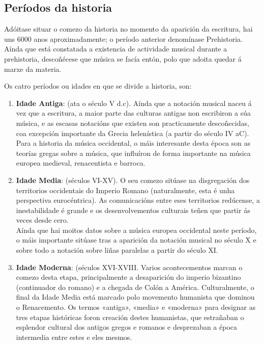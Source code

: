 \documentclass[a4paper, twoside]{templates/ociamthesis}
\begin{document}
\hypertarget{peruxedodos-da-historia}{%
\subsection*{Períodos da historia}\label{peruxedodos-da-historia}}

Adóitase situar o comezo da historia no momento da aparición da escritura, hai uns 6000 anos aproximadamente; o período anterior denomínase Prehistoria. Aínda que está constatada a existencia de actividade musical durante a prehistoria, descoñécese que música se facía entón, polo que adoita quedar á marxe da materia.

Os catro períodos ou idades en que se divide a historia, son:

\begin{enumerate}
\def\labelenumi{\arabic{enumi}.}
\item
  \textbf{Idade Antiga}:
  (ata o século V d.c). Aínda que a notación musical naceu á vez que a escritura, a maior parte das culturas antigas non escribiron a súa música, e as escasas notacións que existen son practicamente descoñecidas, coa excepción importante da Grecia helenística (a partir do século IV aC).\\
  Para a historia da música occidental, o máis interesante desta época son as teorías gregas sobre a música, que influíron de forma importante na música europea medieval, renacentista e barroca.
\item
  \textbf{Idade Media}:
  (séculos VI-XV). O seu comezo sitúase na disgregación dos territorios occidentais do Imperio Romano (naturalmente, esta é unha perspectiva eurocéntrica). As comunicacións entre eses territorios redúcense, a inestabilidade é grande e os desenvolvementos culturais teñen que partir ás veces desde cero.\\
  Aínda que hai moitos datos sobre a música europea occidental neste período, o máis importante sitúase tras a aparición da notación musical no século X e sobre todo a notación sobre liñas paralelas a partir do século XI.
\item
  \textbf{Idade Moderna}:
  (séculos XVI-XVIII. Varios acontecementos marcan o comezo desta etapa, principalmente a desaparición do imperio bizantino (continuador do romano) e a chegada de Colón a América. Culturalmente, o final da Idade Media está marcado polo movemento humanista que dominou o Renacemento. Os termos «antiga», «media» e «moderna» para designar as tres etapas históricas foron creación destes humanistas, que estrañaban o esplendor cultural dos antigos gregos e romanos e desprezaban a época intermedia entre estes e eles mesmos.\\

\end{enumerate}
\end{document}

